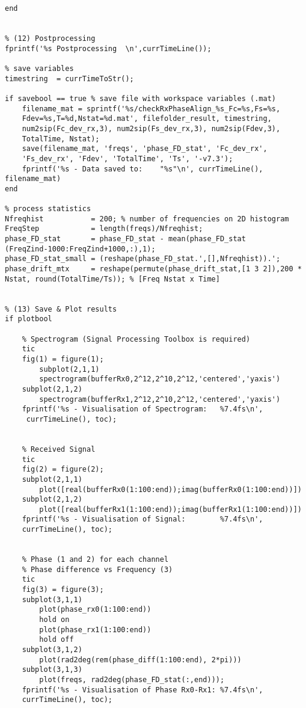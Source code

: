 \begin{verbatim}
end


% (12) Postprocessing
fprintf('%s Postprocessing  \n',currTimeLine());

% save variables
timestring 	= currTimeToStr();

if savebool == true % save file with workspace variables (.mat)
    filename_mat = sprintf('%s/checkRxPhaseAlign_%s_Fc=%s,Fs=%s,
    Fdev=%s,T=%d,Nstat=%d.mat', filefolder_result, timestring, 
    num2sip(Fc_dev_rx,3), num2sip(Fs_dev_rx,3), num2sip(Fdev,3), 
    TotalTime, Nstat);
    save(filename_mat, 'freqs', 'phase_FD_stat', 'Fc_dev_rx', 
    'Fs_dev_rx', 'Fdev', 'TotalTime', 'Ts', '-v7.3');
    fprintf('%s - Data saved to:    "%s"\n', currTimeLine(), filename_mat)
end

% process statistics
Nfreqhist           = 200; % number of frequencies on 2D histogram
FreqStep            = length(freqs)/Nfreqhist;
phase_FD_stat       = phase_FD_stat - mean(phase_FD_stat
(FreqZind-1000:FreqZind+1000,:),1);
phase_FD_stat_small = (reshape(phase_FD_stat.',[],Nfreqhist)).';
phase_drift_mtx     = reshape(permute(phase_drift_stat,[1 3 2]),200 * 
Nstat, round(TotalTime/Ts)); % [Freq Nstat x Time]


% (13) Save & Plot results
if plotbool
    
    % Spectrogram (Signal Processing Toolbox is required)
    tic
    fig(1) = figure(1);
        subplot(2,1,1)
        spectrogram(bufferRx0,2^12,2^10,2^12,'centered','yaxis')
    subplot(2,1,2)
        spectrogram(bufferRx1,2^12,2^10,2^12,'centered','yaxis')
    fprintf('%s - Visualisation of Spectrogram:   %7.4fs\n',
     currTimeLine(), toc);

    
    % Received Signal
    tic
    fig(2) = figure(2);
    subplot(2,1,1)
        plot([real(bufferRx0(1:100:end));imag(bufferRx0(1:100:end))])
    subplot(2,1,2)
        plot([real(bufferRx1(1:100:end));imag(bufferRx1(1:100:end))])
    fprintf('%s - Visualisation of Signal:        %7.4fs\n', 
    currTimeLine(), toc);

    
    % Phase (1 and 2) for each channel
    % Phase difference vs Frequency (3)
    tic
    fig(3) = figure(3);
    subplot(3,1,1)
        plot(phase_rx0(1:100:end))
        hold on
        plot(phase_rx1(1:100:end))
        hold off
    subplot(3,1,2)
        plot(rad2deg(rem(phase_diff(1:100:end), 2*pi)))
    subplot(3,1,3)
        plot(freqs, rad2deg(phase_FD_stat(:,end)));
    fprintf('%s - Visualisation of Phase Rx0-Rx1: %7.4fs\n', 
    currTimeLine(), toc);


\end{verbatim}
